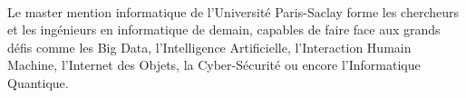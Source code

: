 \\Le master mention informatique de l’Université Paris-Saclay forme les chercheurs et les ingénieurs en informatique de demain, capables de faire face aux  grands défis comme les Big Data, l'Intelligence Artificielle, l’Interaction Humain Machine, l'Internet  des Objets, la Cyber-Sécurité ou encore l'Informatique Quantique.
